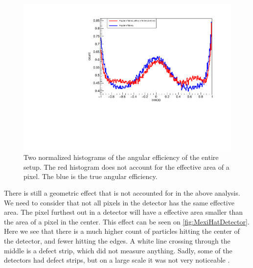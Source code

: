 \begin{figure}[h]
	\includegraphics[width=\linewidth]{../figures/allDetEff.pdf}
	\caption{Two normalized histograms of the angular efficiency of the entire setup. The red histogram does not account for the effective area of a pixel. The blue is the true angular efficiency.}
	\label{fig:effAllDet}
\end{figure}
There is still a geometric effect that is not accounted for in the above analysis. We need to consider that not all pixels in the detector has the same effective area. 
The pixel furthest out in a detector will have a effective area smaller than the area of a pixel in the center. This effect can be seen on \cref{fig:MexiHatDetector}. Here we see that there is a much higher count of particles hitting the center of the detector, and fewer hitting the edges. A white line crossing through the middle is a defect strip, which did not measure anything. Sadly, some of the detectors had defect strips, but on a large scale it was not very noticeable .
